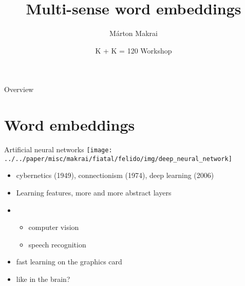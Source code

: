 \documentclass[10pt]{beamer}%
\author{Márton Makrai}
\title{%
  Multi-sense word embeddings}%
\date{K + K = 120 Workshop}
\begin{document}

\maketitle


\begin{frame}{Overview}
  \tableofcontents
\end{frame}


\section{Word embeddings}

\begin{frame}{Artificial neural networks}
\centering\texttt{[image: ../../paper/misc/makrai/fiatal/felido/img/deep\_neural\_network]}
  \begin{itemize}
    \item cybernetics (1949), connectionism (1974), deep learning (2006)
    \item Learning features, more and more abstract layers
    \item
      \begin{itemize}
        \item computer vision \citep{Krizhevsky:2012}
        \item speech recognition \citep{Hinton:2012}
      \end{itemize}
    \item fast learning on the graphics card
    \item like in the brain?
  \end{itemize}
\end{frame}
\end{document}
